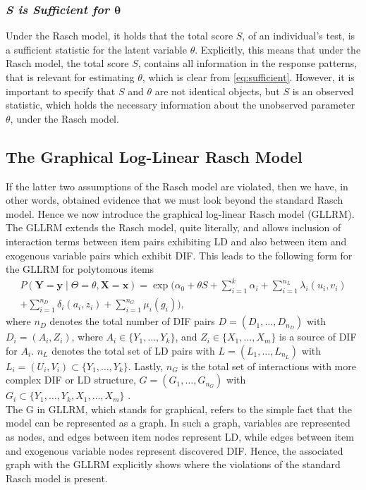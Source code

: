 \documentclass[a4project,12pt]{article}
\theoremstyle{examplestyle}
\theoremstyle{defstyle}
\theoremstyle{thmstyle}
\begin{document}
\subsubsection{\textit{\textbf{\textit{S}} is Sufficient for $\mathbf{\theta}$}}
Under the Rasch model, it holds that the total score $S$, of an individual's test, is a sufficient statistic for the latent variable $\theta$. Explicitly, this means that under the Rasch model, the total score $S$, contains all information in the response patterns, that is relevant for estimating $\theta$, which is clear from \eqref{eq:sufficient}. However, it is important to specify that $S$ and $\theta$ are not identical objects, but $S$ is an observed statistic, which holds the necessary information about the unobserved parameter $\theta$, under the Rasch model.

\subsection{The Graphical Log-Linear Rasch Model}
If the latter two assumptions of the Rasch model are violated, then we have, in other words, obtained evidence that we must look beyond the standard Rasch model. Hence we now introduce the graphical log-linear Rasch model (GLLRM). The GLLRM extends the Rasch model, quite literally, and allows inclusion of interaction terms between item pairs exhibiting LD and also between item and exogenous variable pairs which exhibit DIF. This leads to the following form for the GLLRM for polytomous items 
\begin{align}
    P(\mathbf{Y}=\mathbf{y}\mid \Theta=\theta,\mathbf{X}=\mathbf{x}) = \exp\Big(\alpha_0+\theta S+\sum_{i=1}^k\alpha_i+\sum_{i=1}^{n_L}\lambda_i(u_i,v_i)\\+ \sum_{i=1}^{n_D}\delta_i(a_i,z_i)+\sum_{i=1}^{n_G}\mu_i(g_i)\Big),
\end{align}
where $n_D$ denotes the total number of DIF pairs $D=(D_1,\dots,D_{n_D})$ with $D_i=(A_i,Z_i)$, where $A_i\in\{Y_1,\dots,Y_k\}$, and $Z_i\in\{X_1,\dots,X_m\}$ is a source of DIF for $A_i$. $n_L$ denotes the total set of LD pairs with $L=(L_1,\dots,L_{n_L})$ with $L_i=(U_i,V_i)\subset \{Y_1,\dots,Y_k\}$. Lastly, $n_G$ is the total set of interactions with more complex DIF or LD structure, $G=(G_1,\dots,G_{n_G})$ with $G_i\subset \{Y_1,\dots,Y_k,X_1,\dots,X_m\}$ \cite{kreiner-christensen-2011}. \\
The G in GLLRM, which stands for graphical, refers to the simple fact that the model can be represented as a graph. In such a graph, variables are represented as nodes, and edges between item nodes represent LD, while edges between item and exogenous variable nodes represent discovered DIF. Hence, the associated graph with the GLLRM explicitly shows where the violations of the standard Rasch model is present. 
\end{document}
